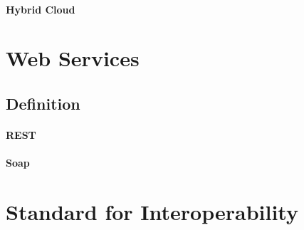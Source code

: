 \paragraph{Hybrid Cloud}
\label{paragraph:Hybrid Cloud}

\section{Web Services}
\subsection{Definition}
\paragraph{REST}
\label{paragraph:REST}
\paragraph{Soap}
\label{paragraph:Soap}





\section{Standard for Interoperability}
